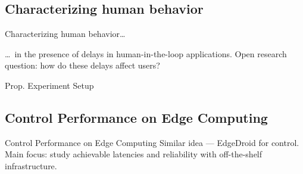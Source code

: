 \documentclass[aspectratio=1610]{beamer}
\begin{document}
\subsection{Characterizing human behavior}
\begin{frame}{Characterizing human behavior\ldots}
    \begin{block}{\ldots~in the presence of delays in human-in-the-loop applications.}
        Open research question: how do these delays affect users?
    \end{block}
    \begin{center}
        
    \end{center}
\end{frame}

\begin{frame}{Prop. Experiment Setup}
    \begin{center}
        
    \end{center}
\end{frame}

\subsection{Control Performance on Edge Computing}
\begin{frame}{Control Performance on Edge Computing}
    Similar idea --- EdgeDroid for control.\\
    Main focus: study achievable latencies and reliability with off-the-shelf infrastructure.\\
    \vspace{2em}
    \begin{center}
        
    \end{center}

\end{frame}
\end{document}
